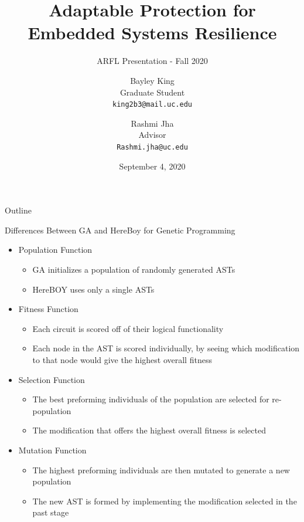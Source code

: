 \documentclass[handout]{beamer}
\title[DAGSI Update - RY9-UC-20-4]{Adaptable Protection for Embedded Systems Resilience}
\subtitle{ARFL Presentation - Fall 2020}
\author[B. King \& R. Jha]
       {\parbox[t]{1.5in}{Bayley King\\Graduate Student\\\texttt{king2b3@mail.uc.edu}} \and 
        \parbox[t]{1.5in}{Rashmi Jha\\Advisor\\ \texttt{Rashmi.jha@uc.edu}}}
\institute[UC]{MIND Lab \and University of Cincinnati}
\date{September 4, 2020}
\begin{document}
\begin{frame}
  \titlepage
\end{frame}

\begin{frame}{Outline}
  \tableofcontents
\end{frame}

\newcommand{\lenitem}[2][.85\linewidth]{\parbox[t]{#1}{\strut #2\strut}}
\begin{frame}{Differences Between GA and HereBoy for Genetic Programming}
\begin{itemize}
  \item Population Function
  \begin{itemize}
    \item GA initializes a population of randomly generated ASTs
    \item HereBOY uses only a single ASTs
  \end{itemize}
  \item Fitness Function
  \begin{itemize}
    \item Each circuit is scored off of their logical functionality 
    \item Each node in the AST is scored individually, by seeing which modification to that node would give the highest overall fitness
  \end{itemize}
  \item Selection Function
  \begin{itemize}
    \item The best preforming individuals of the population are selected for re-population
    \item The modification that offers the highest overall fitness is selected
  \end{itemize}
  \item Mutation Function
  \begin{itemize}
    \item \lenitem{The highest preforming individuals are then mutated to generate a new population}
    \item \lenitem{The new AST is formed by implementing the modification selected in the past stage}
  \end{itemize}
\end{itemize}
\end{frame}
\end{document}

